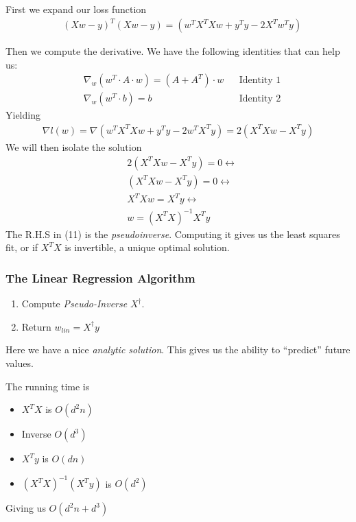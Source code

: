 \documentclass{article}
\begin{document}
      First we expand our loss function
      \begin{align}
        & (Xw - y)^T (Xw-y) = (w^TX^TXw + y^Ty - 2X^Tw^Ty)
      \end{align}

      Then we compute the derivative. We have the following identities that can help us:
      \begin{align}
        & \nabla_w(w^T \cdot A \cdot w)=(A+A^T) \cdot w && \text{Identity 1}\\
        & \nabla_w(w^T \cdot b) = b && \text{Identity 2} 
      \end{align}
    Yielding
      \begin{align}
        \nabla l(w) = \nabla (w^TX^TXw + y^Ty - 2w^TX^Ty) = 2(X^TXw-X^Ty)
      \end{align}
        We will then isolate the solution
        \begin{align}
            & 2(X^TXw - X^Ty) = 0 \leftrightarrow\\
            & (X^TXw - X^Ty) = 0 \leftrightarrow \\
            & X^TXw = X^Ty \leftrightarrow \\
            & w = (X^TX)^{-1}X^Ty
        \end{align}
        The R.H.S in (11) is the \emph{pseudoinverse}. Computing it gives us the least squares fit, or if $X^TX$ is invertible, a unique optimal solution.
      
      \subsubsection{The Linear Regression Algorithm}
      \begin{enumerate}
        \item Compute \emph{Pseudo-Inverse} $X^{\dagger}$.
        \item Return $w_{lin} = X^{\dagger}y$
      \end{enumerate}
      Here we have a nice \emph{analytic solution}. This gives us the ability to ``predict'' future values.
      
      The running time is 
      \begin{itemize}
          \item $X^TX$ is $O(d^2n)$
          \item Inverse $O(d^3)$
          \item $X^Ty$ is $O(dn)$
          \item $(X^TX)^{-1}(X^Ty)$ is $O(d^2)$
      \end{itemize}
      Giving us $O(d^2n + d^3)$
\end{document}
